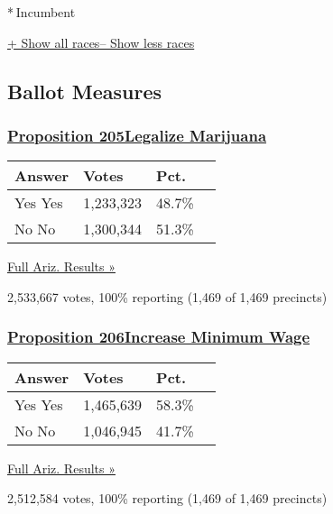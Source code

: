 * Incumbent~

\protect\hyperlink{}{+ Show all races-- Show less races}

\hypertarget{ballot-measures}{%
\subsection{Ballot Measures}\label{ballot-measures}}

\hypertarget{proposition-205legalize-marijuana}{%
\subsubsection{\texorpdfstring{\href{//www.nytimes3xbfgragh.onion/elections/2016/results/arizona-ballot-measure-205-legalize-marijuana}{Proposition
205Legalize
Marijuana}}{Proposition 205Legalize Marijuana}}\label{proposition-205legalize-marijuana}}

\begin{longtable}[]{@{}llll@{}}
\toprule
Answer & Votes & Pct. &\tabularnewline
\midrule
\endhead
 Yes Yes & 1,233,323 & 48.7\% &\tabularnewline
 No No & 1,300,344 & 51.3\% &\tabularnewline
\bottomrule
\end{longtable}

\href{https://www.nytimes3xbfgragh.onion/elections/2016/results/arizona}{Full
Ariz. Results »}

2,533,667 votes, 100\% reporting (1,469 of 1,469 precincts)

\hypertarget{proposition-206increase-minimum-wage}{%
\subsubsection{\texorpdfstring{\href{//www.nytimes3xbfgragh.onion/elections/2016/results/arizona-ballot-measure-206-increase-minimum-wage}{Proposition
206Increase Minimum
Wage}}{Proposition 206Increase Minimum Wage}}\label{proposition-206increase-minimum-wage}}

\begin{longtable}[]{@{}llll@{}}
\toprule
Answer & Votes & Pct. &\tabularnewline
\midrule
\endhead
 Yes Yes & 1,465,639 & 58.3\% &\tabularnewline
 No No & 1,046,945 & 41.7\% &\tabularnewline
\bottomrule
\end{longtable}

\href{https://www.nytimes3xbfgragh.onion/elections/2016/results/arizona}{Full
Ariz. Results »}

2,512,584 votes, 100\% reporting (1,469 of 1,469 precincts)


